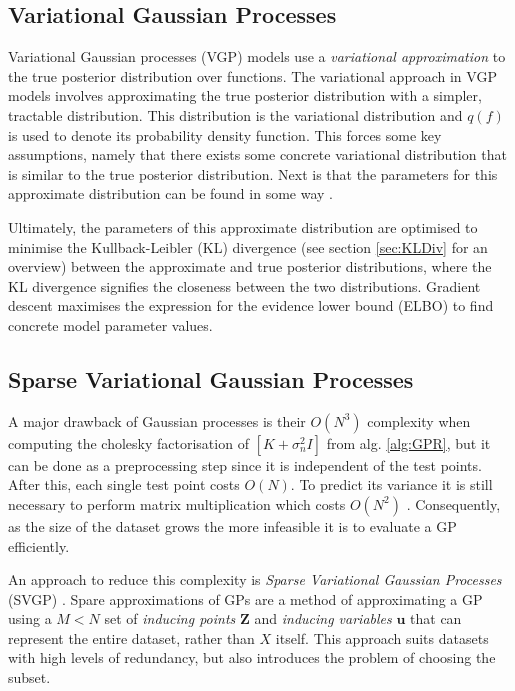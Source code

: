 \documentclass[12pt,a4paper]{report}
\theoremstyle{definition}
\begin{document}
\subsection{Variational Gaussian Processes}

Variational Gaussian processes (VGP) models use a \emph{variational approximation} to the true posterior distribution over functions.
The variational approach in VGP models involves approximating the true posterior distribution with a simpler, tractable distribution. 
This distribution is the variational distribution and $q(f)$ is used to denote its probability density function.
This forces some key assumptions, namely that there exists some concrete variational distribution that is similar to the true posterior distribution. 
Next is that the parameters for this approximate distribution can be found in some way \citep{Yi2020}.

Ultimately, the parameters of this approximate distribution are optimised to minimise the Kullback-Leibler (KL) divergence (see section \ref{sec:KLDiv} for an overview) between the approximate and true posterior distributions, where the KL divergence signifies the closeness between the two distributions.
Gradient descent maximises the expression for the evidence lower bound (ELBO) to find concrete model parameter values.

\subsection{Sparse Variational Gaussian Processes}

A major drawback of Gaussian processes is their $O(N^3)$ complexity when computing the cholesky factorisation of $[K + \sigma_{n}^2I]$ from alg. \ref{alg:GPR}, but it can be done as a preprocessing step since it is independent of the test points. 
After this, each single test point costs $O(N)$. 
To predict its variance it is still necessary to perform matrix multiplication which costs $O(N^2)$ \citep{Kaiser2020}.
Consequently, as the size of the dataset grows the more infeasible it is to evaluate a GP efficiently.

An approach to reduce this complexity is \emph{Sparse Variational Gaussian Processes} (SVGP) \citep{Hensman2015}.
Spare approximations of GPs are a method of approximating a GP using a $M < N$ set of \emph{inducing points} $\textbf{Z}$ and \emph{inducing variables} $\textbf{u}$ that can represent the entire dataset, rather than $X$ itself. 
This approach suits datasets with high levels of redundancy, but also introduces the problem of choosing the subset.
\end{document}
